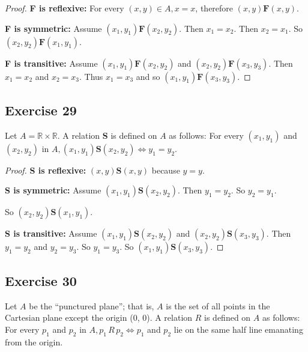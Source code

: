 \documentclass[14pt]{extarticle}
\newcommand{\R}{\mathbb{R}}
\begin{document}
\begin{proof}
        {\bf F is reflexive:} For every \((x, y) \in A, x = x\), therefore \((x, y) \textbf{F} (x, y)\).

                {\bf F is symmetric:} Assume \((x_1, y_1) \textbf{F} (x_2, y_2)\). Then \(x_1 = x_2\). Then \(x_2 = x_1\). So
        \((x_2, y_2) \textbf{F} (x_1, y_1)\).

                {\bf F is transitive:} Assume \((x_1, y_1) \textbf{F} (x_2, y_2)\) and \((x_2, y_2) \textbf{F} (x_3, y_3)\). Then
        \(x_1 = x_2\) and \(x_2 = x_3\). Thus \(x_1 = x_3\) and so \((x_1, y_1) \textbf{F} (x_3, y_3)\).
\end{proof}

\subsection{Exercise 29}
Let \(A = \R \times \R\). A relation {\bf S} is defined on \(A\) as follows: For every \((x_1, y_1)\) and \((x_2, y_2)
\) in \(A, (x_1, y_1) \textbf{S} (x_2, y_2) \iff y_1 = y_2\).

\begin{proof}
        {\bf S is reflexive:} \((x, y) \textbf{S} (x, y)\) because \(y = y\).

                {\bf S is symmetric:} Assume \((x_1, y_1) \textbf{S} (x_2, y_2)\). Then \(y_1 = y_2\). So \(y_2 = y_1\).

        So \((x_2, y_2) \textbf{S} (x_1, y_1)\).

                {\bf S is transitive:} Assume \((x_1, y_1) \textbf{S} (x_2, y_2)\) and \((x_2, y_2) \textbf{S} (x_3, y_3)\). Then
        \(y_1 = y_2\) and \(y_2 = y_3\). So \(y_1 = y_3\). So \((x_1, y_1) \textbf{S} (x_3, y_3)\).
\end{proof}

\subsection{Exercise 30}
Let \(A\) be the “punctured plane”; that is, \(A\) is the set of all points in the Cartesian plane except the origin
(0, 0). A relation \(R\) is defined on \(A\) as follows: For every \(p_1\) and \(p_2\) in \(A, p_1 \, R \, p_2 \iff
p_1\) and \(p_2\) lie on the same half line emanating from the origin.
\end{document}
